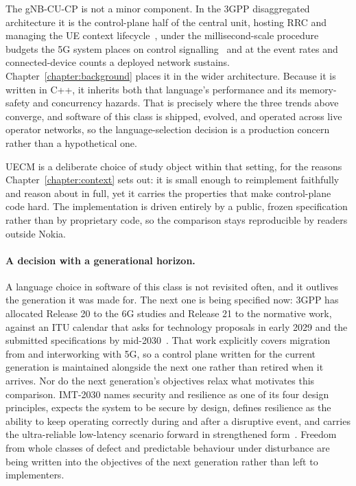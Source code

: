 \documentclass[english,twoside,openright,a4paper,censored,csm,software-track-2020]{HYthesisML}
\begin{document}
The gNB-CU-CP is not a minor component. In the 3GPP disaggregated architecture it is the
control-plane half of the central unit, hosting RRC and managing the UE context
lifecycle~\cite{3gpp38401,3gpp38331}, under the millisecond-scale procedure budgets the 5G system
places on control signalling~\cite{3gpp38913} and at the event rates and connected-device counts
a deployed network sustains. Chapter~\ref{chapter:background} places it in the wider architecture.
Because it is written in C++, it inherits both that language's performance and its memory-safety
and concurrency hazards. That is precisely where the three trends above converge, and software of
this class is shipped, evolved, and operated across live operator networks, so the
language-selection decision is a production concern rather than a hypothetical one.

UECM is a deliberate choice of study object within that setting, for the reasons
Chapter~\ref{chapter:context} sets out: it is small enough to reimplement faithfully and reason about in
full, yet it carries the properties that make control-plane code hard. The implementation is
driven entirely by a public, frozen specification rather than by proprietary code, so the
comparison stays reproducible by readers outside Nokia.

\paragraph{A decision with a generational horizon.}
A language choice in software of this class is not revisited often, and it outlives the
generation it was made for. The next one is being specified now: 3GPP has allocated Release 20 to
the 6G studies and Release 21 to the normative work, against an ITU calendar that asks for
technology proposals in early 2029 and the submitted specifications by
mid-2030~\cite{3gpp2024road6g}. That work explicitly covers migration from and interworking with
5G, so a control plane written for the current generation is maintained alongside the next one
rather than retired when it arrives. Nor do the next generation's objectives relax what motivates
this comparison. IMT-2030 names security and resilience as one of its four design principles,
expects the system to be secure by design, defines resilience as the ability to keep operating
correctly during and after a disruptive event, and carries the ultra-reliable low-latency scenario
forward in strengthened form~\cite{itu2023imt2030}. Freedom from whole classes of defect and
predictable behaviour under disturbance are being written into the objectives of the next
generation rather than left to implementers.
\end{document}
